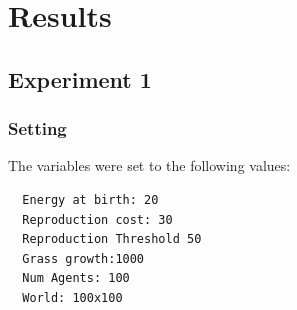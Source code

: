 \documentclass[11pt]{article}
\begin{document}
\section{Results}

\subsection{Experiment 1}

\subsubsection{Setting}
The variables were set to the following values:
\begin{lstlisting}
  Energy at birth: 20
  Reproduction cost: 30
  Reproduction Threshold 50
  Grass growth:1000
  Num Agents: 100
  World: 100x100
\end{lstlisting}
\end{document}

